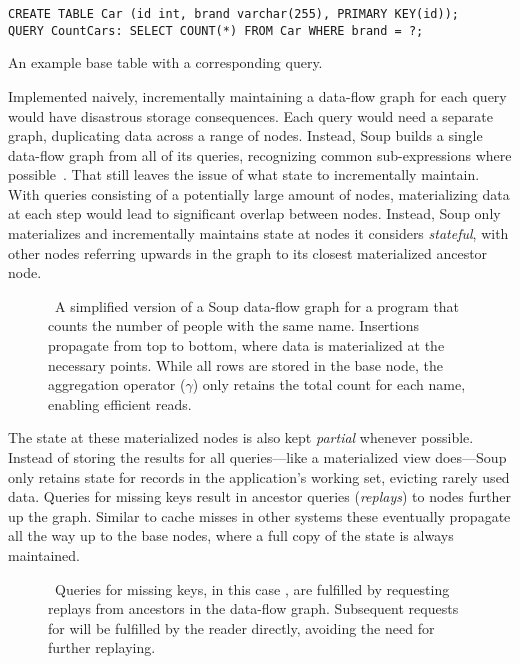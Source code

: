 \begin{listing}[H]
  \begin{verbatim}
CREATE TABLE Car (id int, brand varchar(255), PRIMARY KEY(id));
QUERY CountCars: SELECT COUNT(*) FROM Car WHERE brand = ?;
  \end{verbatim}

  \caption{An example base table with a corresponding
  query.}\label{lst:example-schema}
\end{listing}

Implemented naively, incrementally maintaining a data-flow graph for each query
would have disastrous storage consequences. Each query would need a separate
graph, duplicating data across a range of nodes. Instead, Soup builds a single
data-flow graph from all of its queries, recognizing common sub-expressions
where possible~\cite{common-expression}. That still leaves the issue of what
state to incrementally maintain. With queries consisting of a potentially large
amount of nodes, materializing data at each step would lead to significant
overlap between nodes. Instead, Soup only materializes and incrementally
maintains state at nodes it considers \textit{stateful}, with other nodes
referring upwards in the graph to its closest materialized ancestor node.

\begin{figure}[H]
  \centering
  
  \caption{\
    A simplified version of a Soup data-flow graph for a program that counts the
    number of people with the same name. Insertions propagate from top to
    bottom, where data is materialized at the necessary points. While all rows
    are stored in the \code{People} base node, the aggregation operator ($
    \gamma $) only retains the total count for each name, enabling efficient
    reads.
  }\label{fig:flow}
\end{figure}

The state at these materialized nodes is also kept \textit{partial} whenever
possible. Instead of storing the results for all queries---like a materialized
view does---Soup only retains state for records in the application's working
set, evicting rarely used data. Queries for missing keys result in ancestor
queries (\textit{replays}) to nodes further up the graph. Similar to cache
misses in other systems these eventually propagate all the way up to the base
nodes, where a full copy of the state is always maintained.

\begin{figure}[H]
  \centering
  
  \caption{\
    Queries for missing keys, in this case , are fulfilled by requesting
    replays from ancestors in the data-flow graph. Subsequent requests for
    \code{X} will be fulfilled by the reader directly, avoiding the need for
    further replaying.
  }\label{fig:replay}
\end{figure}

